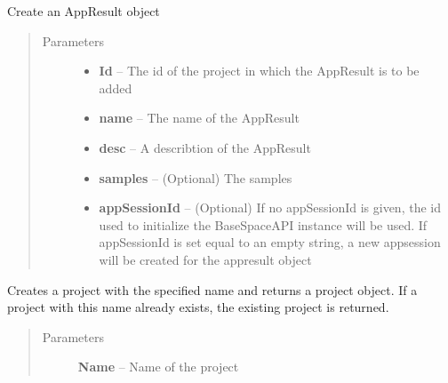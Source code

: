 \documentclass[letterpaper,10pt,english]{sphinxmanual}
\begin{document}
\begin{fulllineitems}
\begin{fulllineitems}
\label{Available modules:BaseSpacePy.api.BaseSpaceAPI.BaseSpaceAPI.createAppResult}
Create an AppResult object
\begin{quote}\begin{description}
\item[{Parameters}] \leavevmode\begin{itemize}
\item {} 
\textbf{Id} -- The id of the project in which the AppResult is to be added

\item {} 
\textbf{name} -- The name of the AppResult

\item {} 
\textbf{desc} -- A describtion of the AppResult

\item {} 
\textbf{samples} -- (Optional) The samples

\item {} 
\textbf{appSessionId} -- (Optional) If no appSessionId is given, the id used to initialize the BaseSpaceAPI instance will be used. If appSessionId is set equal to an empty string, a new appsession will be created for the appresult object

\end{itemize}

\end{description}\end{quote}

\end{fulllineitems}


\begin{fulllineitems}
\label{Available modules:BaseSpacePy.api.BaseSpaceAPI.BaseSpaceAPI.createProject}
Creates a project with the specified name and returns a project object. 
If a project with this name already exists, the existing project is returned.
\begin{quote}\begin{description}
\item[{Parameters}] \leavevmode
\textbf{Name} -- Name of the project

\end{description}\end{quote}


\end{fulllineitems}
\end{fulllineitems}
\end{document}
